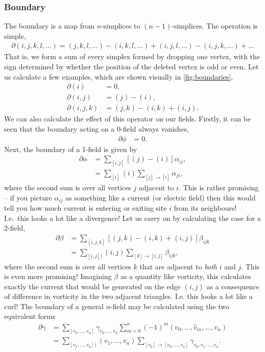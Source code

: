 \documentclass[11pt, oneside]{article} %
\numberwithin{equation}{section}
\begin{document}
\subsubsection{Boundary}
The boundary is a map from $n$-simplices to $(n-1)$-simplices. The operation is simple, 
\begin{align}
    \partial (i,j,k,l,...) = (j,k,l,...) - (i,k,l,...) + (i,j,l,...) - (i,j,k,...) + ...
\end{align}
That is, we form a sum of every simplex formed by dropping one vertex, with the sign determined by whether the position of the deleted vertex is odd or even. Let us calculate a few examples, which are shown visually in \cref{fig:boundaries},
\begin{align}
    \partial (i) &= 0, \\
    \partial (i,j) &= (j) - (i), \\
    \partial (i,j,k) &= (j,k) - (i,k) + (i,j).
\end{align}
We can also calculate the effect of this operator on our fields. Firstly, it can be seen that the boundary acting on a 0-field always vanishes,
\begin{align}
    \partial \phi & = 0.
\end{align}
Next, the boundary of a 1-field is given by
\begin{align}
    \partial \alpha & = \sum_{[i,j]}
    \left [ 
    (j) - (i)
    \right ]
    \alpha_{ij} , \\
    & = \sum_{[i]} (i) \sum_{[j] \rightarrow [i]}
    \alpha_{ji},
\end{align}
where the second sum is over all vertices $j$ adjacent to $i$. This is rather promising -- if you picture $\alpha_{ij}$ as something like a current (or electric field) then this would tell you how much current is entering or exiting site $i$ from its neighbours! I.e.~this looks a lot like a divergence! Let us carry on by calculating the case for a 2-field,
\begin{align}
    \partial \beta &= \sum_{[i,j,k]} 
    \left [
    (j,k) - (i,k) + (i,j)
    \right ]
    \beta_{ijk} \\
    & = \sum_{[i,j])} (i,j) 
    \sum_{[k]\rightarrow [i,j]}
    \beta_{ijk},
\end{align}
where the second sum is over all vertices $k$ that are adjacent to \textit{both} $i$ and $j$. This is even more promising! Imagining $\beta$ as a quantity like vorticity, this calculates exactly the current that would be generated on the edge $(i,j)$ as a consequence of difference in vorticity in the two adjacent triangles. I.e. this looks a lot like a curl! The boundary of a general $n$-field may be calculated using the two equivalent forms
\begin{align}
    \partial \gamma &=\sum_{[v_0, ... ,v_{n}]} \gamma_{ v_0, ... ,v_{n}}
    \sum_{m = 0}^n (-1)^m
    (v_0, ...,\hat v_m,... ,v_{n}) 
    \\
    &=\sum_{[v_1, ... ,v_{n}])} (v_1, ... ,v_{n}) 
    \sum_{[v_0]\rightarrow [v_0, ... ,v_{n}]}
    \gamma_{v_0, v_1, ... ,v_{n}}.
\end{align}
\end{document}
